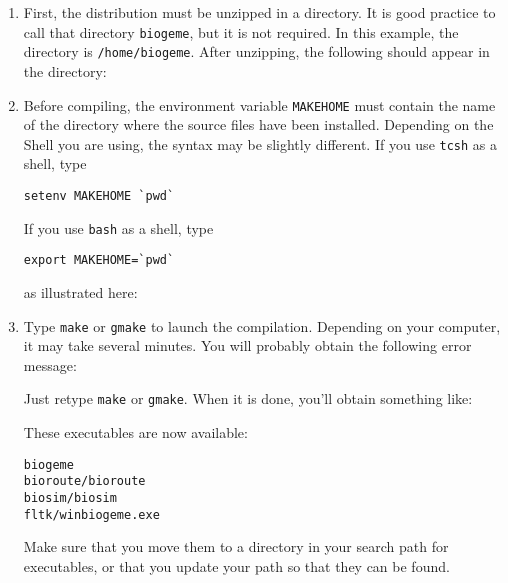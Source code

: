 \documentclass[12pt]{memoir}
\begin{document}
\begin{enumerate}
\item First, the distribution must be unzipped in a directory. It is
good practice to call that directory \texttt{biogeme}, but it is not
required. In this example, the directory is
\texttt{/home/biogeme}. After unzipping, the following should appear in
the directory:
\begin{center}
\end{center}

\item Before compiling, the environment variable \texttt{MAKEHOME}
must contain the name of the directory where the source files have
been installed. Depending on the Shell you are using, the syntax may
be slightly different.
If you use \texttt{tcsh} as a shell, type
{\footnotesize
\begin{verbatim}
setenv MAKEHOME `pwd`
\end{verbatim}
}
 If you use \texttt{bash} as a shell, type
{\footnotesize
\begin{verbatim}
export MAKEHOME=`pwd`
\end{verbatim}
}
as illustrated here:
\begin{center}
\end{center}
\item Type \texttt{make} or \texttt{gmake} to launch the
compilation. Depending on your computer, it may take several
minutes. You will probably obtain the following error message:
\begin{center}
\end{center}
Just retype \texttt{make} or \texttt{gmake}. When it is done, you'll
obtain something like:
\begin{center}
\end{center}

These executables are now available: 
{\footnotesize
\begin{verbatim}
biogeme 
bioroute/bioroute 
biosim/biosim 
fltk/winbiogeme.exe 
\end{verbatim}
}
Make sure that you move them to a directory in your search path for executables, or that you update your path so that they can be found. 

\end{enumerate}

\end{document}
